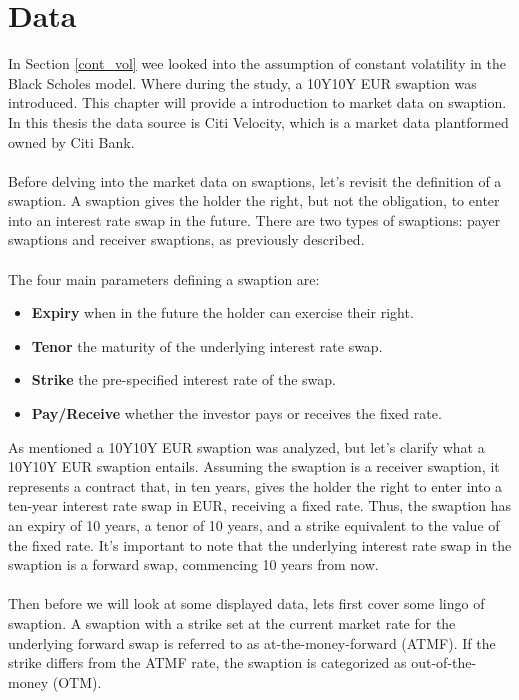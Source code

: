 \section{Data}
In Section \ref{cont_vol} wee looked into the assumption of constant volatility in the Black Scholes model. 
Where during the study, a 10Y10Y EUR swaption was introduced. This chapter will provide a introduction to 
market data on swaption. In this thesis the data source is Citi Velocity, which is a market data plantformed
owned by Citi Bank.
\\\\
Before delving into the market data on swaptions, let's revisit the definition of a swaption. 
A swaption gives the holder the right, but not the obligation, to enter into an interest rate swap in the future. 
There are two types of swaptions: payer swaptions and receiver swaptions, as previously described.
\\\\
The four main parameters defining a swaption are:
\begin{itemize}
\item \textbf{Expiry} \quad when in the future the holder can exercise their right.
\item \textbf{Tenor} \quad  the maturity of the underlying interest rate swap.
\item \textbf{Strike} \quad the pre-specified interest rate of the swap.
\item \textbf{Pay/Receive} \quad whether the investor pays or receives the fixed rate.
\end{itemize}
\noindent
As mentioned a 10Y10Y EUR swaption was analyzed, but let's clarify what a 10Y10Y EUR swaption entails. 
Assuming the swaption is a receiver swaption, it represents a contract that, in ten years, 
gives the holder the right to enter into a ten-year interest rate swap in EUR, receiving a fixed rate. 
Thus, the swaption has an expiry of 10 years, a tenor of 10 years, and a strike equivalent to the value of the fixed rate. 
It's important to note that the underlying interest rate swap in the swaption is a forward swap, commencing 10 years from now.
\\\\
Then before we will look at some displayed data, lets first cover some lingo of swaption. 
A swaption with a strike set at the current market rate for the underlying forward swap is referred 
to as at-the-money-forward (ATMF). If the strike differs from the ATMF rate, the swaption is categorized as out-of-the-money (OTM).
